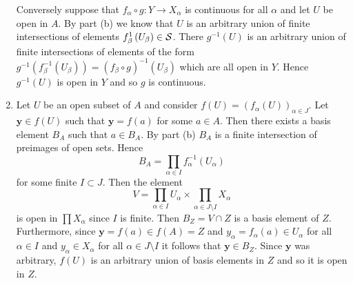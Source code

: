 \begin{sol}
\begin{enumerate}
        Conversely suppose that  $f_\alpha\circ g:Y\to X_\alpha$ is continuous for all $\alpha$ and 
        let $U$ be open in $A$.
        By part (b) we know that $U$ is an arbitrary union of finite intersections of elements 
        $f^{1}_\beta\left(U_\beta\right)\in\mathcal{S}$. 
        There $g^{-1}(U)$ is an arbitrary union of finite intersections of elements of the form 
        $g^{-1}\left(f^{-1}_\beta\left(U_\beta\right)\right)=\left(f_\beta\circ g\right)^{-1}\left(U_\beta\right)$ 
        which are all open in $Y$.
        Hence $g^{-1}(U)$ is open in $Y$ and so $g$ is continuous.
        \item Let $U$ be an open subset of $A$ and consider $f(U)=\left(f_\alpha(U)\right)_{\alpha\in J}$.
            Let $\mathbf{y}\in f\left(U\right)$ such that $\mathbf{y}=f(a)$ for some $a\in A$. 
            Then there exists a basis element $B_A$ such that $a\in B_A$. By part (b) $B_A$ is a finite 
            intersection of preimages of open sets. 
            Hence
            $$ B_A=\prod_{\alpha\in I}f^{-1}_\alpha\left(U_\alpha\right)$$
            for some finite $I\subset J$. Then the element
            $$ V = \prod_{\alpha\in I}U_\alpha\times\prod_{\alpha\in J\setminus I}X_\alpha$$
            is open in $\prod X_\alpha$ since $I$ is finite. Then $B_Z=V\cap Z$ is a basis element of $Z$. 
            Furthermore, since $\mathbf{y}=f(a)\in f(A)=Z$ and $y_\alpha=f_\alpha(a)\in U_\alpha$ for all 
            $\alpha\in I$ and $y_\alpha\in X_\alpha$ for all $\alpha\in J\setminus I$ it follows that 
            $\mathbf{y}\in B_Z$.
            Since $\mathbf{y}$ was arbitrary, $f(U)$ is an arbitrary union of basis elements in $Z$ and 
            so it is open in $Z$. 
            
    \end{enumerate}
\end{sol}